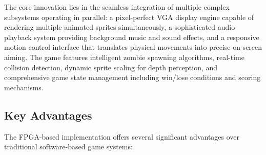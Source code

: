 \documentclass[12pt,a4paper]{article}
\begin{document}
The core innovation lies in the seamless integration of multiple complex subsystems operating in parallel: a pixel-perfect VGA display engine capable of rendering multiple animated sprites simultaneously, a sophisticated audio playback system providing background music and sound effects, and a responsive motion control interface that translates physical movements into precise on-screen aiming. The game features intelligent zombie spawning algorithms, real-time collision detection, dynamic sprite scaling for depth perception, and comprehensive game state management including win/lose conditions and scoring mechanisms.

\subsection{Key Advantages}

The FPGA-based implementation offers several significant advantages over traditional software-based game systems:
\end{document}
